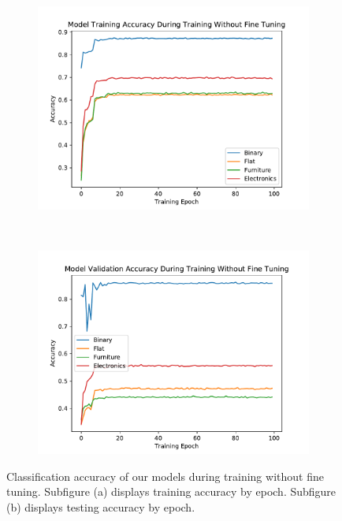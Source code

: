 \begin{figure}
    \centering
    \begin{subfigure}[t]{0.5\columnwidth}
        \centering
        \includegraphics[width=\textwidth]{img/false_accs_train}
        \caption{}
    \end{subfigure}%
    ~ 
    \begin{subfigure}[t]{0.5\columnwidth}
        \centering
        \includegraphics[width=\textwidth]{img/false_accs_val}
        \caption{}
    \end{subfigure}%
	\caption{
Classification accuracy of our models during training without fine tuning.
Subfigure (a) displays training accuracy by epoch.
Subfigure (b) displays testing accuracy by epoch. 
}
	\label{fig:false_accs}
\end{figure}